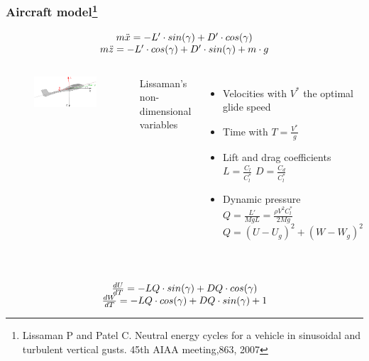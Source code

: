 \documentclass[compress]{beamer}
\begin{document}
\begin{frame}%
  \frametitle{Aircraft model\footnote{\tiny Lissaman P and Patel C. Neutral energy cycles for a vehicle in sinusoidal and turbulent vertical gusts. 45th AIAA meeting,863, 2007}}
  \begin{equation*}
    \begin{array}[c]{c}
      m \ddot{x} = -L' \cdot sin(\gamma) + D' \cdot cos(\gamma) \\
      m \ddot{z} = -L' \cdot cos(\gamma) + D' \cdot sin(\gamma) + m \cdot g
    \end{array}
  \end{equation*}
  \begin{columns}
    \begin{figure}[h]
      \centering
      \includegraphics[width=1\textwidth]{./Figures/glider.eps}
    \end{figure}
    Lissaman's non-dimensional variables
    \begin{itemize}
      \item Velocities with $V^{*}$ the optimal glide speed
      \item Time with $T=\frac{V^{*}}{g}$
      \item Lift and drag coefficients $L= \frac{C_l}{C_l^*}$ $D= \frac{C_d}{C_l^*}$
      \item Dynamic pressure $Q = \frac{L'}{MgL} = \frac{ \rho V^{2} C_l^* }{2Mg}$ $Q=(U-U_g)^2+ (W-W_g)^2$
    \end{itemize}
  \end{columns}
  \begin{equation*}
    \begin{array}[c]{c}
      \\
      \frac{dU}{dT}= -LQ \cdot sin(\gamma) + DQ \cdot cos(\gamma) \\
      \frac{dW}{dT}= -LQ \cdot cos(\gamma) + DQ \cdot sin(\gamma) + 1
    \end{array}
  \end{equation*}
\end{frame}
\end{document}
